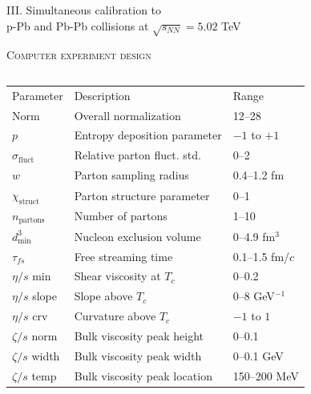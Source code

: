 \documentclass[aspectratio=169]{beamer}
\newcommand{\sqrts}{\sqrt{s_{NN}}}
\newcommand{\sigmaf}{\sigma_\text{fluct}}
\newcommand{\X}{\chi_\text{struct}}
\newcommand{\npartons}{n_\text{partons}}
\newcommand{\dmin}{d_\text{min}^3}
\newcommand{\paddedhline}{\noalign{\smallskip}\hline\noalign{\smallskip}}
\begin{document}
\begin{frame}
  \begin{center}
    \Large III. Simultaneous calibration to\\
    p-Pb and Pb-Pb collisions at $\sqrts=5.02$ TeV
  \end{center}
\end{frame}

\begin{frame}[t]{\scshape Computer experiment design}
  \bigskip
  \begin{columns}[T]
    \begin{column}{.6\textwidth}
      \scriptsize
      \begin{tabular}{lll}
        Parameter         & Description                        & Range           \\
        \paddedhline
        Norm              & Overall normalization              & 12--28          \\
        $p$               & Entropy deposition parameter       & $-1$ to $+1$    \\
        $\sigmaf$         & Relative parton fluct. std.\       & 0--2            \\
        $w$               & Parton sampling radius             & 0.4--1.2 fm     \\
        $\X$              & Parton structure parameter         & 0--1            \\
        $\npartons$       & Number of partons                  & 1--10           \\
        $\dmin$           & Nucleon exclusion volume           & 0--4.9 fm$^3$   \\
        $\tau_{fs}$       & Free streaming time                & 0.1--1.5 fm/$c$ \\
        $\eta/s$ min      & Shear viscosity at $T_c$           & 0--0.2          \\
        $\eta/s$ slope    & Slope above $T_c$                  & 0--8 GeV$^{-1}$ \\
        $\eta/s$ crv      & Curvature above $T_c$              & $-1$ to $1$     \\
        $\zeta/s$ norm    & Bulk viscosity peak height         & 0--0.1          \\
        $\zeta/s$ width   & Bulk viscosity peak width          & 0--0.1 GeV      \\
        $\zeta/s$ temp    & Bulk viscosity peak location       & 150--200 MeV    \\

\end{tabular}
\end{column}
\end{columns}
\end{frame}
\end{document}
